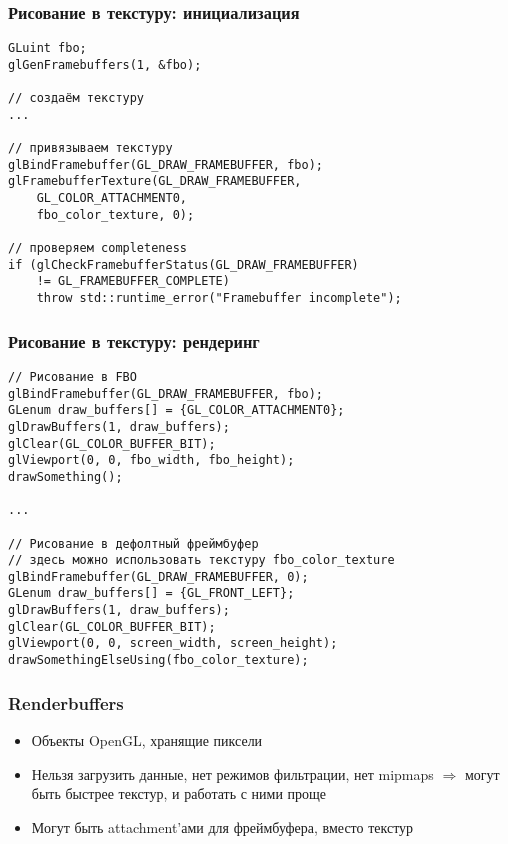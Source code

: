 \documentclass[10pt]{beamer}
\begin{document}
\begin{frame}[fragile]
\frametitle{Рисование в текстуру: инициализация}
\fontsize{8pt}{8pt}
\begin{verbatim}
GLuint fbo;
glGenFramebuffers(1, &fbo);

// создаём текстуру
...

// привязываем текстуру
glBindFramebuffer(GL_DRAW_FRAMEBUFFER, fbo);
glFramebufferTexture(GL_DRAW_FRAMEBUFFER,
    GL_COLOR_ATTACHMENT0,
    fbo_color_texture, 0);

// проверяем completeness
if (glCheckFramebufferStatus(GL_DRAW_FRAMEBUFFER)
    != GL_FRAMEBUFFER_COMPLETE)
    throw std::runtime_error("Framebuffer incomplete");
\end{verbatim}
\end{frame}

\begin{frame}[fragile]
\frametitle{Рисование в текстуру: рендеринг}
\fontsize{8pt}{8pt}
\begin{verbatim}
// Рисование в FBO
glBindFramebuffer(GL_DRAW_FRAMEBUFFER, fbo);
GLenum draw_buffers[] = {GL_COLOR_ATTACHMENT0};
glDrawBuffers(1, draw_buffers);
glClear(GL_COLOR_BUFFER_BIT);
glViewport(0, 0, fbo_width, fbo_height);
drawSomething();

...

// Рисование в дефолтный фреймбуфер
// здесь можно использовать текстуру fbo_color_texture
glBindFramebuffer(GL_DRAW_FRAMEBUFFER, 0);
GLenum draw_buffers[] = {GL_FRONT_LEFT};
glDrawBuffers(1, draw_buffers);
glClear(GL_COLOR_BUFFER_BIT);
glViewport(0, 0, screen_width, screen_height);
drawSomethingElseUsing(fbo_color_texture);
\end{verbatim}
\end{frame}

\begin{frame}[fragile]
\frametitle{Renderbuffers}
\begin{itemize}
\item Объекты OpenGL, хранящие пиксели
\pause
\item Нельзя загрузить данные, нет режимов фильтрации, нет mipmaps \begin{math}\Longrightarrow\end{math} могут быть быстрее текстур, и работать с ними проще
\pause
\item Могут быть attachment'ами для фреймбуфера, вместо текстур
\end{itemize}
\end{frame}
\end{document}
